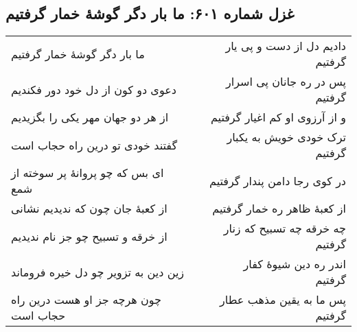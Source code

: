\begin{center}
\section*{غزل شماره ۶۰۱: ما بار دگر گوشهٔ خمار گرفتیم}
\label{sec:601}
\begin{longtable}{l p{0.5cm} r}
ما بار دگر گوشهٔ خمار گرفتیم
&&
دادیم دل از دست و پی یار گرفتیم
\\
دعوی دو کون از دل خود دور فکندیم
&&
پس در ره جانان پی اسرار گرفتیم
\\
از هر دو جهان مهر یکی را بگزیدیم
&&
و از آرزوی او کم اغیار گرفتیم
\\
گفتند خودی تو درین راه حجاب است
&&
ترک خودی خویش به یکبار گرفتیم
\\
ای بس که چو پروانهٔ پر سوخته از شمع
&&
در کوی رجا دامن پندار گرفتیم
\\
از کعبهٔ جان چون که ندیدیم نشانی
&&
از کعبهٔ ظاهر ره خمار گرفتیم
\\
از خرقه و تسبیح چو جز نام ندیدیم
&&
چه خرقه چه تسبیح که زنار گرفتیم
\\
زین دین به تزویر چو دل خیره فروماند
&&
اندر ره دین شیوهٔ کفار گرفتیم
\\
چون هرچه جز او هست درین راه حجاب است
&&
پس ما به یقین مذهب عطار گرفتیم
\\
\end{longtable}
\end{center}
